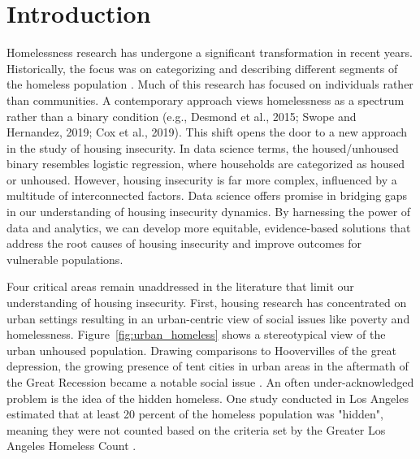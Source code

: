 \chapter{Introduction}  

Homelessness research has undergone a significant transformation in recent years. Historically, the focus was on categorizing and describing different segments of the homeless population \citep{lee_homelessness_2021}. Much of this research has focused on individuals rather than communities. A contemporary approach views homelessness as a spectrum rather than a binary condition (e.g., Desmond et al., 2015; Swope and Hernandez, 2019; Cox et al., 2019). This shift opens the door to a new approach in the study of housing insecurity. In data science terms, the housed/unhoused binary resembles logistic regression, where households are categorized as housed or unhoused. However, housing insecurity is far more complex, influenced by a multitude of interconnected factors. Data science offers promise in bridging gaps in our understanding of housing insecurity dynamics. By harnessing the power of data and analytics, we can develop more equitable, evidence-based solutions that address the root causes of housing insecurity and improve outcomes for vulnerable populations.


Four critical areas remain unaddressed in the literature that limit our understanding of housing insecurity. First, housing research has concentrated on urban settings resulting in an urban-centric view of social issues like poverty and homelessness. Figure~\ref{fig:urban_homeless}  shows a stereotypical view of the urban unhoused population. Drawing comparisons to Hoovervilles of the great depression, the growing presence of tent cities in urban areas in the aftermath of the Great Recession became a notable social issue \citep{herring_roots_2015}. An often under-acknowledged problem is the idea of the hidden homeless. One study conducted in Los Angeles estimated that at least 20 percent of the homeless population was "hidden", meaning they were not counted based on the criteria set by the Greater Los Angeles Homeless Count \citep{agans_enumerating_2014}.  \textcolor{white}{\citep{molina_notitle_2023}} %

